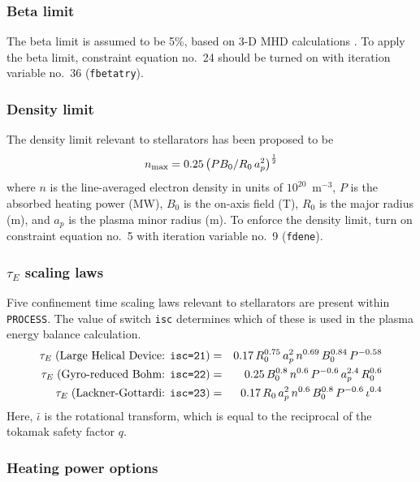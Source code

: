 \documentclass[11pt,a4paper]{report}
\newcommand{\process}{\mbox{\texttt{PROCESS}}}
\begin{document}
\subsubsection{Beta limit}

The beta limit is assumed to be 5\%, based on 3-D MHD calculations
\cite{Nuhrenberg}. To apply the beta limit, constraint equation no.\ 24 should
be turned on with iteration variable no.\ 36 (\texttt{fbetatry}).

\subsubsection{Density limit}

The density limit relevant to stellarators has been proposed to be~\cite{LHD}
\begin{equation}
n_{\mbox{\scriptsize max}} = 0.25\left( P B_0 / R_0 \, a_p^2\right)^\frac{1}{2}
\end{equation}
where $n$ is the line-averaged electron density in units of
$10^{20}$~m$^{-3}$, $P$ is the absorbed heating power (MW), $B_0$ is the
on-axis field (T), $R_0$ is the major radius (m), and $a_p$ is the plasma
minor radius (m). To enforce the density limit, turn on constraint equation
no.\ 5 with iteration variable no.\ 9 (\texttt{fdene}).

\subsubsection{$\tau_E$ scaling laws}

Five confinement time scaling laws relevant to stellarators are present
within \process. The value of switch \texttt{isc} determines which of these is
used in the plasma energy balance calculation.
\begin{eqnarray}
\tau_E\; (\mbox{Large Helical Device: \texttt{isc=21}})
& = & 0.17 \, R_0^{0.75} \, a_p^2 \, n^{0.69} \, B_0^{0.84} \, P^{-0.58} \\
\tau_E\; (\mbox{Gyro-reduced Bohm: \texttt{isc=22}})
 & = & 0.25 \, B_0^{0.8} \, n^{0.6} \, P^{-0.6} \, a_p^{2.4} \, R_0^{0.6} \\
\tau_E\; (\mbox{Lackner-Gottardi: \texttt{isc=23}})
& = & 0.17 \, R_0 \, a_p^2 \, n^{0.6} \, B_0^{0.8} \, P^{-0.6} \, \iota^{0.4}
\end{eqnarray}
Here, $\bar{\iota}$ is the rotational transform, which is equal to the reciprocal
of the tokamak safety factor $q$.

\subsubsection{Heating power options}
\end{document}
